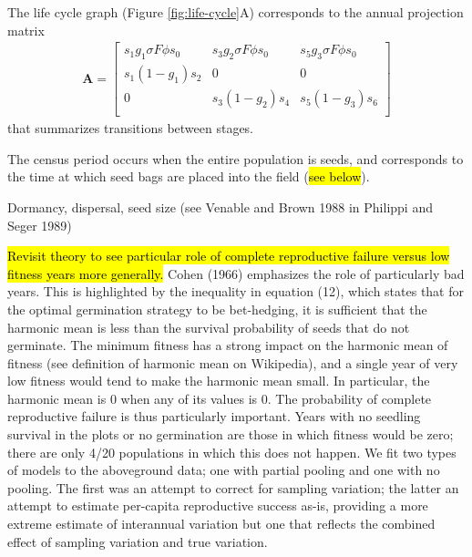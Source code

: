 \documentclass[12pt, oneside, titlepage]{article}   	%
\begin{document}
The life cycle graph (Figure \ref{fig:life-cycle}A) corresponds to the annual projection matrix
%
\begin{gather}
\bm{A} = 
\begin{bmatrix} 
s_1 g_1 \sigma F \phi s_0 & s_3 g_2 \sigma F \phi s_0 & s_5 g_3 \sigma F \phi s_0 \\
s_1 (1-g_1) s_2 & 0 & 0 \\
0 & s_3 (1-g_2) s_4  & s_5 (1-g_3) s_6  \\
\end{bmatrix}
\label{eq:projection-matrix}
\end{gather} 
%
that summarizes transitions between stages. 

The census period occurs when the entire population is seeds, and corresponds to the time at which seed bags are placed into the field (\hl{see below}).

Dormancy, dispersal, seed size (see Venable and Brown 1988 in Philippi and Seger 1989)


\hl{Revisit theory to see particular role of complete reproductive failure versus low fitness years more generally.} Cohen (1966) emphasizes the role of particularly bad years. This is highlighted by the inequality in equation (12), which states that for the optimal germination strategy to be bet-hedging, it is sufficient that the harmonic mean is less than the survival probability of seeds that do not germinate. The minimum fitness has a strong impact on the harmonic mean of fitness (see definition of harmonic mean on Wikipedia), and a single year of very low fitness would tend to make the harmonic mean small. In particular, the harmonic mean is 0 when any of its values is 0. The probability of complete reproductive failure is thus particularly important. Years with no seedling survival in the plots or no germination are those in which fitness would be zero; there are only 4/20 populations in which this does not happen. We fit two types of models to the aboveground data; one with partial pooling and one with no pooling. The first was an attempt to correct for sampling variation; the latter an attempt to estimate per-capita reproductive success as-is, providing a more extreme estimate of interannual variation but one that reflects the combined effect of sampling variation and true variation.
\end{document}
